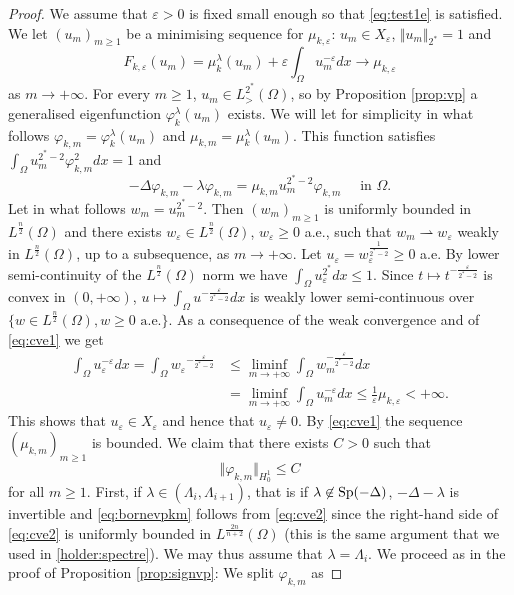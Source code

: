 \documentclass[10pt]{amsart}
\numberwithin{equation}{section}
\newcommand{\Sp}{{\rm Sp}}
\newcommand{\ve}{\varepsilon}
\newcommand{\vp}{\varphi}
\newcommand{\Om}{\Omega}
\newcommand{\mkl}{\mu_{k}^{\lambda}}
\newcommand{\mkle}{\mu_{k,\ve}}
\newcommand{\vkl}{\varphi_{k}^{\lambda}}
\newcommand{\Fke}{F_{k,\ve}}
\theoremstyle{plain}
\theoremstyle{remark}
\begin{document}
\begin{proof}
We assume that $\ve>0$ is fixed small enough so that \eqref{eq:test1e} is satisfied. We let $(u_m)_{m\ge 1}$ be a minimising sequence for $\mkle$: $u_m \in X_\ve$, $\Vert u_m \Vert_{2^*} =1$ and 
\begin{equation} \label{eq:cve1}
\Fke(u_m) = \mkl(u_m)  + \ve \int_{\Om} u_m^{-\ve}dx  \to \mkle
\end{equation}
 as $m \to + \infty$. For every $m \ge 1$, $u_m \in L^{2^*}_>(\Om)$, so by Proposition \ref{prop:vp} a generalised eigenfunction $\vkl(u_m)$ exists. We will let for simplicity in what follows $\vp_{k,m} = \vkl(u_m)$ and $ \mu_{k,m} = \mkl(u_m)$. This function satisfies $\int_{\Om} u_m^{2^*-2} \vp_{k,m}^2dx = 1$  and 
\begin{equation} \label{eq:cve2}
 - \Delta \vp_{k,m} - \lambda \vp_{k,m} = \mu_{k,m} u_m^{2^*-2} \vp_{k,m} \quad \text{ in } \Om. 
 \end{equation}
Let in what follows $w_m = u_m^{2^*-2}$. Then $(w_m)_{m \ge1}$ is uniformly bounded in $L^{\frac{n}{2}}(\Om)$ and there exists $w_\ve \in L^{\frac{n}{2}}(\Om)$, $w_\ve \ge 0$ a.e., such that $w_m \rightharpoonup w_\ve$ weakly in $L^{\frac{n}{2}}(\Om)$, up to a subsequence, as $m \to + \infty$. Let $u_\ve = w_\ve^{\frac{1}{2^*-2}} \ge0$ a.e. By lower semi-continuity of the $L^{\frac{n}{2}}(\Om)$ norm we have $ \int_{\Om} u_\ve^{2^*}dx \le 1$. Since $t \mapsto t^{-\frac{\ve}{2^*-2}}$ is convex in $(0, + \infty)$, $u \mapsto \int_{\Om} u^{-\frac{\ve}{2^*-2}} dx$ is weakly lower semi-continuous over $\{ w \in L^{\frac{n}{2}}(\Om), w \ge 0 \text{ a.e.} \}$. As a consequence of the weak convergence and of \eqref{eq:cve1} we get
\begin{equation} \label{eq:cve3}
\begin{aligned}
 \int_{\Om} u_\ve^{-\ve}dx = \int_{\Om} {w_\ve}^{- \frac{\ve}{2^*-2}} &\le \liminf_{m \to + \infty}  \int_{\Om} w_m^{-\frac{\ve}{2^*-2}}dx \\
 &=  \liminf_{m \to + \infty}  \int_{\Om} u_m^{-\ve}dx  \le \frac{1}{\ve} \mkle < + \infty. 
\end{aligned} 
 \end{equation}
This shows that $u_\ve \in X_\ve$ and hence that $u_\ve \neq 0$. By \eqref{eq:cve1} the sequence $(\mu_{k,m})_{m \ge1}$ is bounded. We claim that there exists $C >0$ such that 
\begin{equation} \label{eq:bornevpkm}
\Vert \vp_{k,m} \Vert_{H^1_0} \le C
\end{equation}
for all $m \ge 1$. First, if $\lambda \in (\Lambda_i, \Lambda_{i+1})$, that is if $\lambda \not \in \Sp(-\Delta)$, $-\Delta- \lambda$ is invertible and \eqref{eq:bornevpkm} follows from \eqref{eq:cve2} since the right-hand side of \eqref{eq:cve2} is uniformly bounded in $L^{\frac{2n}{n+2}}(\Om)$ (this is the same argument that we used in \eqref{holder:spectre}). We may thus assume that $\lambda = \Lambda_i$. We proceed as in the proof of Proposition \ref{prop:signvp}: We split $\vp_{k,m}$ as 

\end{proof}
\end{document}
